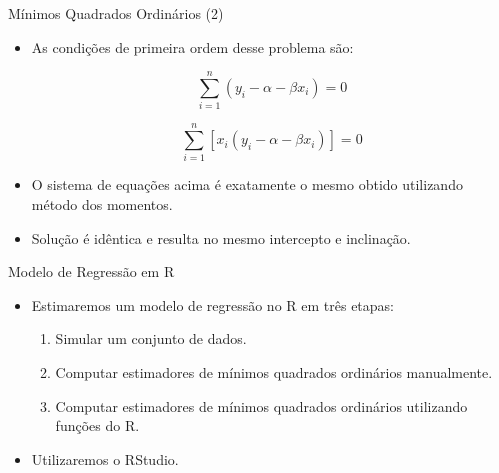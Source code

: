 \documentclass[10pt,slides,xcolor=pdftex,dvipsnames,table]{beamer}
\begin{document}

\begin{frame}{Mínimos Quadrados Ordinários (2)}

    \begin{itemize}\itemsep1.2em
    
     \item As condições de primeira ordem desse problema são:
     
     $$ \sum_{i=1}^n \left( y_i - \alpha - \beta x_i \right) = 0 $$
     
     $$ \sum_{i=1}^n  \left[ x_i \left( y_i - \alpha - \beta x_i \right) \right] = 0 $$
     
	\item O sistema de equações acima é exatamente o mesmo obtido utilizando método dos momentos.
	
	\item Solução é idêntica e resulta no mesmo intercepto e inclinação.        
     
     \end{itemize}
    
\end{frame}


\begin{frame}{Modelo de Regressão em R}

    \begin{itemize}\itemsep1.2em
    
     \item Estimaremos um modelo de regressão no R em três etapas: 
     
     \begin{enumerate}
     \item Simular um conjunto de dados. 
  
     \item Computar estimadores de mínimos quadrados ordinários manualmente. 
     
     \item Computar estimadores de mínimos quadrados ordinários utilizando funções do R.            
    
	\end{enumerate}          
     
	\item Utilizaremos o RStudio. 
     
     \end{itemize}
    
\end{frame}
\end{document}
